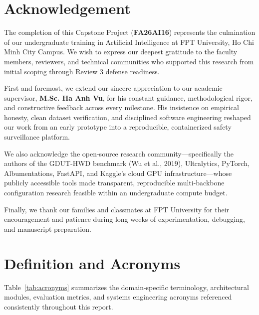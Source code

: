 \clearpage
\section*{Acknowledgement}

The completion of this Capstone Project (\textbf{FA26AI16}) represents the culmination of our undergraduate training in Artificial Intelligence at FPT University, Ho Chi Minh City Campus. We wish to express our deepest gratitude to the faculty members, reviewers, and technical communities who supported this research from initial scoping through Review 3 defense readiness.

First and foremost, we extend our sincere appreciation to our academic supervisor, \textbf{M.Sc. Ha Anh Vu}, for his constant guidance, methodological rigor, and constructive feedback across every milestone. His insistence on empirical honesty, clean dataset verification, and disciplined software engineering reshaped our work from an early prototype into a reproducible, containerized safety surveillance platform.

We also acknowledge the open-source research community---specifically the authors of the GDUT-HWD benchmark (Wu et al., 2019), Ultralytics, PyTorch, Albumentations, FastAPI, and Kaggle's cloud GPU infrastructure---whose publicly accessible tools made transparent, reproducible multi-backbone configuration research feasible within an undergraduate compute budget.

Finally, we thank our families and classmates at FPT University for their encouragement and patience during long weeks of experimentation, debugging, and manuscript preparation.

\clearpage
\section*{Definition and Acronyms}

Table~\ref{tab:acronyms} summarizes the domain-specific terminology, architectural modules, evaluation metrics, and systems engineering acronyms referenced consistently throughout this report.

